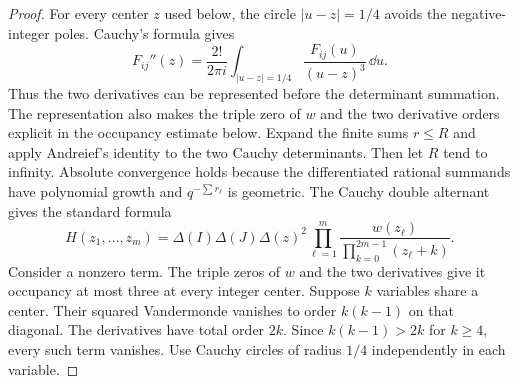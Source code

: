\begin{proof}
For every center $z$ used below, the circle $|u-z|=1/4$ avoids the
negative-integer poles. Cauchy's formula gives
\begin{equation}
 F_{ij}''(z)=\frac{2!}{2\pi i}
 \int_{|u-z|=1/4}\frac{F_{ij}(u)}{(u-z)^3}\,\dd u.
 \label{eq:cauchy-fpp}
\end{equation}
Thus the two derivatives can be represented before the determinant summation.
The representation also makes the triple zero of $w$ and the two derivative
orders explicit in the occupancy estimate below.
Expand the finite sums $r\le R$ and apply Andreief's identity
\cite{Andreief} to the two Cauchy determinants. Then let $R$ tend to
infinity. Absolute convergence holds because the differentiated rational
summands have polynomial growth and $q^{-\sum r_\ell}$ is geometric. The
Cauchy double alternant gives the standard formula
\cite[Eq.~(2.7)]{Krattenthaler}
\[
 H(z_1,\ldots,z_m)=
 \Delta(I)\Delta(J)\Delta(z)^2
 \prod_{\ell=1}^m\frac{w(z_\ell)}
 {\prod_{k=0}^{2m-1}(z_\ell+k)}.
\]
Consider a nonzero term. The triple zeros of $w$ and the two derivatives
give it occupancy at most three at every integer center. Suppose $k$
variables share a center. Their squared Vandermonde vanishes to order
$k(k-1)$ on that diagonal. The derivatives have total order $2k$. Since
$k(k-1)>2k$ for $k\ge4$, every such term vanishes. Use Cauchy circles of
radius $1/4$ independently in each variable.


\end{proof}
